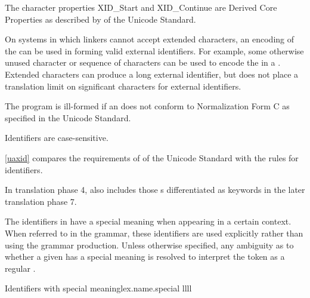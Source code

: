 \pnum
{}%
%
\begin{note}
The character properties XID_Start and XID_Continue are Derived Core Properties
as described by  of the Unicode Standard.
\begin{footnote}
On systems in which linkers cannot accept extended
characters, an encoding of the  can be used in
forming valid external identifiers. For example, some otherwise unused
character or sequence of characters can be used to encode the
 in a . Extended
characters can produce a long external identifier, but \Cpp{} does not
place a translation limit on significant characters for external
identifiers.
\end{footnote}
\end{note}
The program is ill-formed
if an  does not conform to
Normalization Form C as specified in the Unicode Standard.
\begin{note}
Identifiers are case-sensitive.
\end{note}
\begin{note}
\ref{uaxid} compares the requirements of  of the Unicode Standard
with the \Cpp{} rules for identifiers.
\end{note}
\begin{note}
In translation phase 4,
 also includes
those s
differentiated as keywords
in the later translation phase 7.
\end{note}

\pnum
{}%
%
%
%
The identifiers in  have a special meaning when
appearing in a certain context. When referred to in the grammar, these identifiers
are used explicitly rather than using the  grammar production.
Unless otherwise specified, any ambiguity as to whether a given
 has a special meaning is resolved to interpret the
token as a regular .

\begin{multicolfloattable}{Identifiers with special meaning}{lex.name.special}
{llll}
           \\
\columnbreak
{}          \\
\columnbreak
{}          \\
\columnbreak
{}        \\
\end{multicolfloattable}

